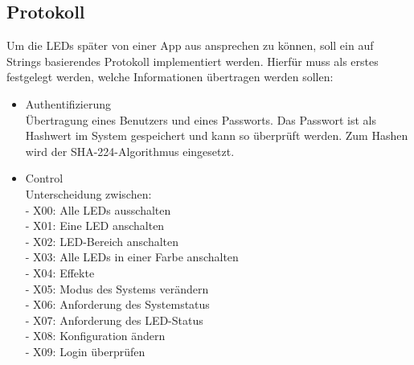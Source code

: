 


\subsection{Protokoll}
Um die LEDs später von einer App aus ansprechen zu können, soll ein auf Strings basierendes Protokoll implementiert werden. Hierfür muss als erstes festgelegt werden, welche Informationen übertragen werden sollen: 
\begin{itemize}
\item Authentifizierung\\
Übertragung eines Benutzers und eines Passworts. Das Passwort ist als Hashwert im System gespeichert und kann so überprüft werden. Zum Hashen wird der SHA-224-Algorithmus eingesetzt.
\item Control\\
Unterscheidung zwischen:\\
- X00: Alle LEDs ausschalten\\
- X01: Eine LED anschalten\\
- X02: LED-Bereich anschalten\\
- X03: Alle LEDs in einer Farbe anschalten\\
- X04: Effekte\\
- X05: Modus des Systems verändern\\ 
- X06: Anforderung des Systemstatus\\
- X07: Anforderung des LED-Status\\
- X08: Konfiguration ändern\\
- X09: Login überprüfen\\
         

\end{itemize}
